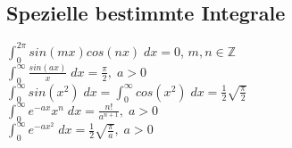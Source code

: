 \subsection{Spezielle bestimmte Integrale}
${\int_0^{2\pi} sin(mx)cos(nx)\;dx=0}$, $m,n\in \mathbb{Z}$\\
${\int_0^\infty \frac{sin(ax)}{x}\;dx=\frac{\pi}{2},\;a>0}$\\
${\int_0^\infty sin(x^2)\;dx=\int_0^\infty cos(x^2)\;dx=\frac{1}{2}\sqrt{\frac{\pi}{2}}}$\\
${\int_0^\infty e^{-ax}x^n\;dx= \frac{n!}{a^{n+1}},\;a>0}$\\
${\int_0^\infty e^{-ax^2}\;dx=\frac{1}{2}\sqrt{\frac{\pi}{a}},\;a>0}$\\

